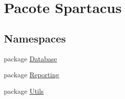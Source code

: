 \hypertarget{namespaceSpartacus}{\section{Pacote Spartacus}
\label{namespaceSpartacus}
}
\subsection*{Namespaces}
\begin{DoxyCompactItemize}
\item 
package \hyperlink{namespaceSpartacus_1_1Database}{Database}
\item 
package \hyperlink{namespaceSpartacus_1_1Reporting}{Reporting}
\item 
package \hyperlink{namespaceSpartacus_1_1Utils}{Utils}
\end{DoxyCompactItemize}
